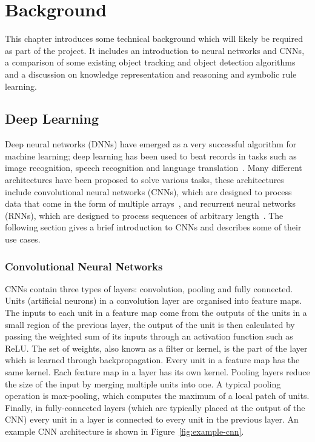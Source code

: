 \documentclass[../interim.tex]{subfiles}
\begin{document}
\chapter{Background}
\label{chapter:background}

This chapter introduces some technical background which will likely be required as part of the project. It includes an introduction to neural networks and CNNs, a comparison of some existing object tracking and object detection algorithms and a discussion on knowledge representation and reasoning and symbolic rule learning.

\section{Deep Learning}

Deep neural networks (DNNs) have emerged as a very successful algorithm for machine learning; deep learning has been used to beat records in tasks such as image recognition, speech recognition and language translation~\cite{deep-learning-intro}. Many different architectures have been proposed to solve various tasks, these architectures include convolutional neural networks (CNNs), which are designed to process data that come in the form of multiple arrays~\cite{deep-learning-intro}, and recurrent neural networks (RNNs), which are designed to process sequences of arbitrary length~\cite{def:rnn}. The following section gives a brief introduction to CNNs and describes some of their use cases.

\subsection{Convolutional Neural Networks}

CNNs contain three types of layers: convolution, pooling and fully connected. Units (artificial neurons) in a convolution layer are organised into feature maps. The inputs to each unit in a feature map come from the outputs of the units in a small region of the previous layer, the output of the unit is then calculated by passing the weighted sum of its inputs through an activation function such as ReLU. The set of weights, also known as a filter or kernel, is the part of the layer which is learned through backpropagation. Every unit in a feature map has the same kernel. Each feature map in a layer has its own kernel. Pooling layers reduce the size of the input by merging multiple units into one. A typical pooling operation is max-pooling, which computes the maximum of a local patch of units. Finally, in fully-connected layers (which are typically placed at the output of the CNN) every unit in a layer is connected to every unit in the previous layer. An example CNN architecture is shown in Figure~\ref{fig:example-cnn}.
\end{document}
